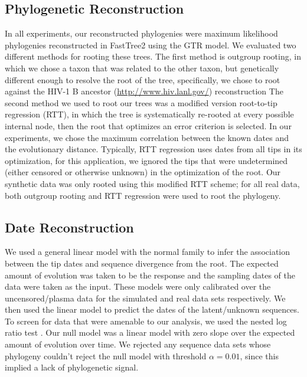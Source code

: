 \subsection * {Phylogenetic Reconstruction} \label{subsec:phylo}
In all experiments, our reconstructed phylogenies were maximum likelihood phylogenies reconstructed in FastTree2 using the GTR model.
We evaluated two different methods for rooting these trees. The first method is outgroup rooting, in which we chose a taxon that was related to the other taxon, but genetically different enough to resolve the root of the tree, specifically, we chose to root against the HIV-1 B ancestor (\href{http://www.hiv.lanl.gov/}{http://www.hiv.lanl.gov/}) reconstruction
The second method we used to root our trees was a modified version root-to-tip regression (RTT), in which the tree is systematically re-rooted at every possible internal node, then the root that optimizes an error criterion is selected.
In our experiments, we chose the maximum correlation between the known dates and the evolutionary distance.
Typically, RTT regression uses dates from all tips in its optimization, for this application, we ignored the tips that were undetermined (either censored or otherwise unknown) in the optimization of the root. 
Our synthetic data was only rooted using this modified RTT scheme; for all real data, both outgroup rooting and RTT regression were used to root the phylogeny. 


\subsection * {Date Reconstruction} \label{subsec:daterecon}
We used a general linear model with the normal family to infer the association between the tip dates and sequence divergence from the root. 
The expected amount of evolution was taken to be the response and the sampling dates of the data were taken as the input. 
These models were only calibrated over the uncensored/plasma data for the simulated and real data sets respectively.
We then used the linear model to predict the dates of the latent/unknown sequences.
To screen for data that were amenable to our analysis, we used the nested log ratio test \citep{Ho14}. 
Our null model was a linear model with zero slope over the expected amount of evolution over time. 
We rejected any sequence data sets whose phylogeny couldn't reject the null model with threshold $\alpha=0.01$, since this implied a lack of phylogenetic signal.


